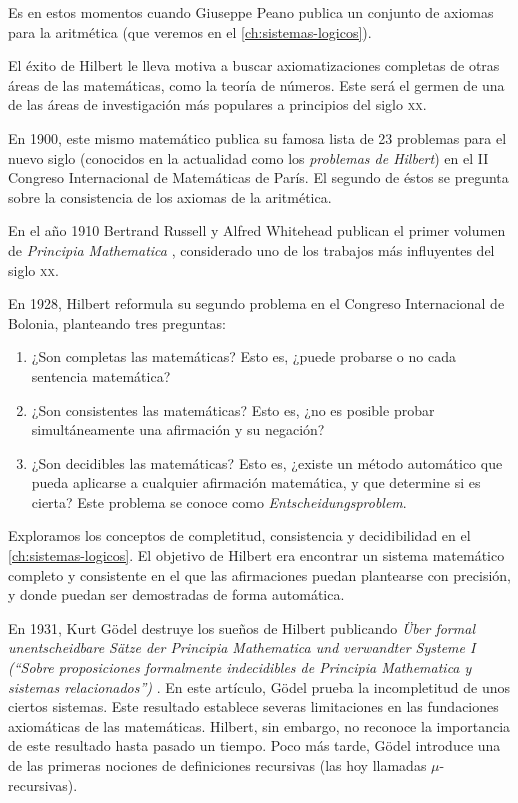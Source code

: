 Es en estos momentos cuando Giuseppe Peano publica un conjunto de axiomas para la aritmética (que veremos en el \cref{ch:sistemas-logicos}).

El éxito de Hilbert le lleva motiva a buscar axiomatizaciones completas de otras áreas de las matemáticas, como la teoría de números. Este será el germen de una de las áreas de investigación más populares a principios del siglo \textsc{xx}.

En 1900, este mismo matemático publica su famosa lista de 23 problemas para el nuevo siglo (conocidos en la actualidad como los \emph{problemas de Hilbert}) en el II Congreso Internacional de Matemáticas de París. El segundo de éstos se pregunta sobre la consistencia de los axiomas de la aritmética. \cite{Hilbert1902}

En el año 1910 Bertrand Russell y Alfred Whitehead publican el primer volumen de \emph{Principia Mathematica} \cite{Whitehead1927}, considerado uno de los trabajos más influyentes del siglo \textsc{xx}.

En 1928, Hilbert reformula su segundo problema en el Congreso Internacional de Bolonia, planteando tres preguntas:

\begin{enumerate}[label=(\arabic*)]
    \item ¿Son completas las matemáticas? Esto es, ¿puede probarse o no cada sentencia matemática?
    \item ¿Son consistentes las matemáticas? Esto es, ¿no es posible probar simultáneamente una afirmación y su negación?
    \item ¿Son decidibles las matemáticas? Esto es, ¿existe un método automático que pueda aplicarse a cualquier afirmación matemática, y que determine si es cierta? Este problema se conoce como \emph{Entscheidungsproblem}.
\end{enumerate}

Exploramos los conceptos de completitud, consistencia y decidibilidad en el \cref{ch:sistemas-logicos}. El objetivo de Hilbert era encontrar un sistema matemático completo y consistente en el que las afirmaciones puedan plantearse con precisión, y donde puedan ser demostradas de forma automática.

En 1931, Kurt Gödel destruye los sueños de Hilbert publicando \emph{Über formal unentscheidbare Sätze der Principia Mathematica und verwandter Systeme I} \textit{(``Sobre proposiciones formalmente indecidibles de Principia Mathematica y sistemas relacionados'')} \cite{Godel1931}. En este artículo, Gödel prueba la incompletitud de unos ciertos sistemas. Este resultado establece severas limitaciones en las fundaciones axiomáticas de las matemáticas. Hilbert, sin embargo, no reconoce la importancia de este resultado hasta pasado un tiempo. Poco más tarde, Gödel introduce una de las primeras nociones de definiciones recursivas (las hoy llamadas $\mu$-recursivas).

